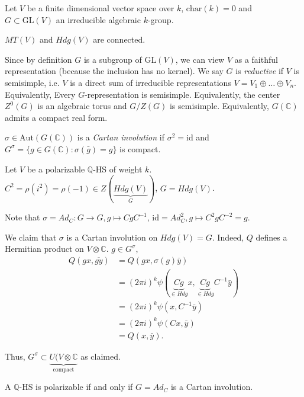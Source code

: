 \noindent
Let $V$ be a finite dimensional vector space
over $k$, $\text{char}(k)=0$
and $G \subset \text{GL}(V)$ an irreducible
algebraic $k$-group.

\begin{remark}
\label{remark-connected}
$MT(V)$ and $Hdg(V)$ are connected.
\end{remark}

\noindent
Since by definition $G$ is a subgroup of
$\text{GL}(V)$,
we can view $V$ as a faithful representation
(because the inclusion has no kernel).
We say $G$ is {\it reductive} if $V$ is
semisimple,
i.e.  $V$ is a direct sum of irreducible
representations
$V=V_1 \oplus  … \oplus  V_n$.
Equivalently, Every $G$-representation is
semisimple.
Equivalently, the center  $Z^0(G)$ is an
algebraic torus
and $G/Z(G)$ is semisimple.
Equivalently, $G(\mathbb{C})$ admits a
compact real form.

$\sigma\in \text{Aut}(G(\mathbb{C}))$
is a {\it Cartan involution}
if $\sigma^2=\text{id}$ and $G^\sigma=\{g\in
G(\mathbb{C}):\sigma(\bar{g})=g \}$
is compact.

\begin{example}
\label{example-polarizable-hs}
Let $V$ be a polarizable $\mathbb{Q}$-HS of
weight $k$.
$C^2=\rho(i^2)=\rho(-1)\in
Z(\underbrace{Hdg(V)}_{G})$,
$G=Hdg(V)$.

Note that  $\sigma=Ad_C:G \to G, g \mapsto
CgC^{-1}$,
$\text{id}=Ad_C^2, g \mapsto  C^2g C^{-2}=g$.

We claim that $\sigma$ is a Cartan involution
on $Hdg(V)=G$.
Indeed,  $Q$ defines a Hermitian product on
$V \otimes \mathbb{C}$.
$g \in G^\sigma$,
$$
\begin{aligned}
Q(gx,\overline{gy})&=
Q(gx,\sigma(g)\bar{y})\\
&=(2\pi i)^k
\psi(\underbrace{Cg}_{\in
Hdg}x,\underbrace{Cg}_{\in
Hdg}C^{-1}\bar{y})\\
&=(2\pi i)^k\psi(x,C^{-1}\bar{y})\\
&=(2\pi i)^k\psi(Cx,\bar{y})\\
&=Q(x,\bar{y}).
\end{aligned}
$$

\noindent
Thus, $G^\sigma \subset \underbrace{U(V
\otimes \mathbb{C}}_{\text{compact}}$
as claimed.
\end{example}

\begin{remark}
\label{remark-polarizable}
A $\mathbb{Q}$-HS is polarizable if and only
if
$G=Ad_C$ is a Cartan involution.
\end{remark}

